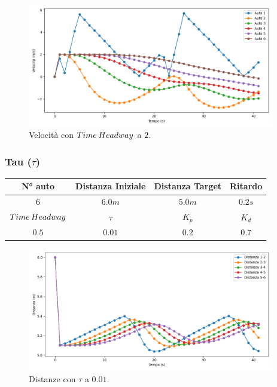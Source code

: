 \begin{figure}[H]
    \includegraphics[width=0.96\textwidth]{images/5-experiment/time-headway/velocity_2.png}
    \caption{Velocità con $Time\hspace{0.2em}Headway$ a $2$.}
    \label{fig:2-headway-velocity}
\end{figure}
\vspace*{\fill}
\newpage


\subsubsection{Tau \texorpdfstring{($\tau$)}{}}
\vspace*{\fill}
\begin{table}[h]
    \centering
    \begin{tabular}{|c|c|c|c|}
        \hline
        N° auto & Distanza Iniziale & Distanza Target & Ritardo \\
        \hline
        $6$ & $6.0 m$ & $5.0 m$ & $0.2 s$ \\
        \hline
        $Time\hspace{0.2em}Headway$ & $\tau$ & $K_p$ & $K_d$  \\
        \hline
        $0.5$ & $0.01$ & $0.2$ & $0.7$ \\
        \hline
    \end{tabular}
\end{table}

\begin{figure}[H]
    \includegraphics[width=0.96\textwidth]{images/5-experiment/tau/distance_0,01.png}
    \caption{Distanze con $\tau$ a $0.01$.}
    \label{fig:0.01-tau-distance}
\end{figure}

